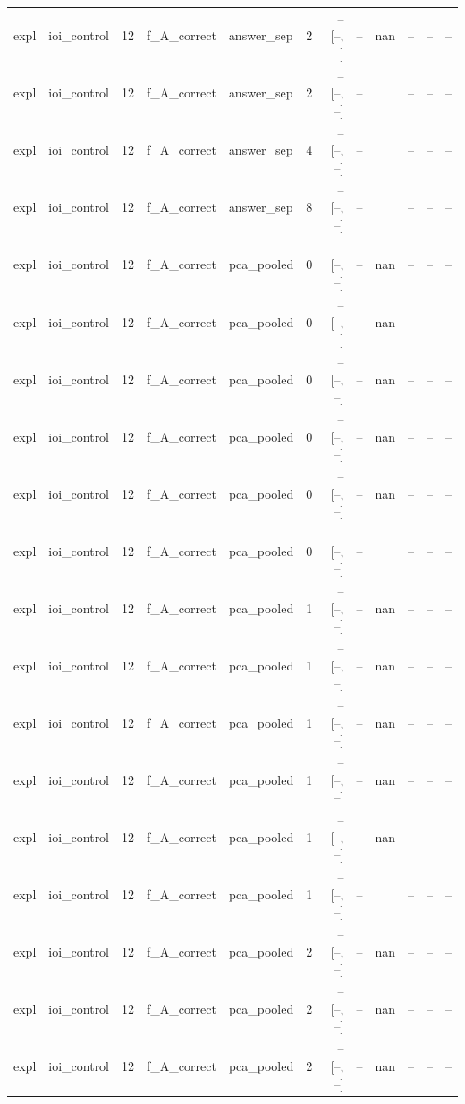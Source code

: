 \begin{tabular}{llrllrrrlrrr}
expl & ioi\_control & 12 & f\_A\_correct & answer\_sep & 2 & -- [--, --] & -- & nan & -- & -- & -- \\
expl & ioi\_control & 12 & f\_A\_correct & answer\_sep & 2 & -- [--, --] & -- &  & -- & -- & -- \\
expl & ioi\_control & 12 & f\_A\_correct & answer\_sep & 4 & -- [--, --] & -- &  & -- & -- & -- \\
expl & ioi\_control & 12 & f\_A\_correct & answer\_sep & 8 & -- [--, --] & -- &  & -- & -- & -- \\
expl & ioi\_control & 12 & f\_A\_correct & pca\_pooled & 0 & -- [--, --] & -- & nan & -- & -- & -- \\
expl & ioi\_control & 12 & f\_A\_correct & pca\_pooled & 0 & -- [--, --] & -- & nan & -- & -- & -- \\
expl & ioi\_control & 12 & f\_A\_correct & pca\_pooled & 0 & -- [--, --] & -- & nan & -- & -- & -- \\
expl & ioi\_control & 12 & f\_A\_correct & pca\_pooled & 0 & -- [--, --] & -- & nan & -- & -- & -- \\
expl & ioi\_control & 12 & f\_A\_correct & pca\_pooled & 0 & -- [--, --] & -- & nan & -- & -- & -- \\
expl & ioi\_control & 12 & f\_A\_correct & pca\_pooled & 0 & -- [--, --] & -- &  & -- & -- & -- \\
expl & ioi\_control & 12 & f\_A\_correct & pca\_pooled & 1 & -- [--, --] & -- & nan & -- & -- & -- \\
expl & ioi\_control & 12 & f\_A\_correct & pca\_pooled & 1 & -- [--, --] & -- & nan & -- & -- & -- \\
expl & ioi\_control & 12 & f\_A\_correct & pca\_pooled & 1 & -- [--, --] & -- & nan & -- & -- & -- \\
expl & ioi\_control & 12 & f\_A\_correct & pca\_pooled & 1 & -- [--, --] & -- & nan & -- & -- & -- \\
expl & ioi\_control & 12 & f\_A\_correct & pca\_pooled & 1 & -- [--, --] & -- & nan & -- & -- & -- \\
expl & ioi\_control & 12 & f\_A\_correct & pca\_pooled & 1 & -- [--, --] & -- &  & -- & -- & -- \\
expl & ioi\_control & 12 & f\_A\_correct & pca\_pooled & 2 & -- [--, --] & -- & nan & -- & -- & -- \\
expl & ioi\_control & 12 & f\_A\_correct & pca\_pooled & 2 & -- [--, --] & -- & nan & -- & -- & -- \\
expl & ioi\_control & 12 & f\_A\_correct & pca\_pooled & 2 & -- [--, --] & -- & nan & -- & -- & -- \\

\end{tabular}
